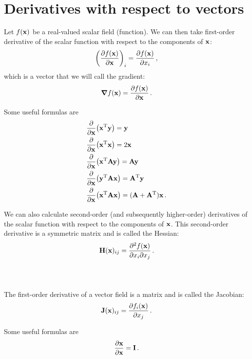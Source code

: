 \section{Derivatives with respect to vectors}
Let $f(\vb{x})$ be a real-valued scalar field (function). We can then take first-order derivative of the scalar function with respect to the components of $\vb{x}$:
\begin{equation}
    \qty(\pdv{f(\vb{x})}{\vb{x}})_i = \pdv{f(\vb{x})}{x_i} \thinspace ,
\end{equation}
which is a vector that we will call the gradient:
\begin{equation}
    \grad{f(\vb{x})} = \pdv{f(\vb{x})}{\vb{x}} \thinspace .
\end{equation}

Some useful formulas are
\begin{align}
    & \pdv{\vb{x}} (\vb{x}^\text{T} \vb{y}) = \vb{y} \\
    & \pdv{\vb{x}} (\vb{x}^\text{T} \vb{x}) = 2 \vb{x} \\
    & \pdv{\vb{x}} (\vb{x}^\text{T} \vb{A} \vb{y}) = \vb{A} \vb{y} \\
    & \pdv{\vb{x}} (\vb{y}^\text{T} \vb{A} \vb{x}) = \vb{A}^\text{T} \vb{y} \\
    & \pdv{\vb{x}} (\vb{x}^\text{T} \vb{A} \vb{x}) = (\vb{A} + \vb{A}^\text{T}) \vb{x} \thinspace .
\end{align}

We can also calculate second-order (and subsequently higher-order) derivatives of the scalar function with respect to the components of $\vb{x}$. This second-order derivative is a symmetric matrix and is called the Hessian:
\begin{equation}
    \vb{H}(\vb{x})_{ij} = \pdv{f(\vb{x})}{x_i}{x_j} \thinspace .
\end{equation}
\\\

The first-order derivative of a vector field is a matrix and is called the Jacobian:
\begin{equation}
    \vb{J}(\vb{x})_{ij} = \pdv{f_i(\vb{x})}{x_j} \thinspace .
\end{equation}

Some useful formulas are
\begin{align}
    \pdv{\vb{x}}{\vb{x}} = \vb{I} \thinspace .
\end{align}
